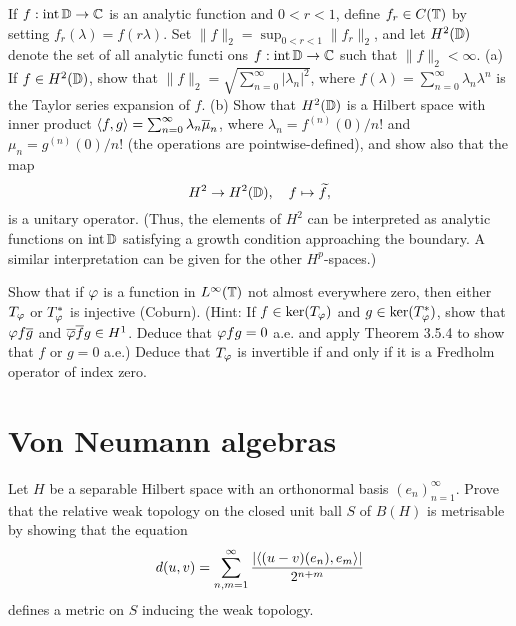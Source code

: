 \documentclass{../../small}
\begin{document}
\begin{prb}
If $f:\operatorname{int}\mathbb{D}\to\mathbb{C}$ is an analytic function and $0<r<1$, define $f_r\in C(\mathbb{T})$ by setting $f_r(\lambda)=f(r\lambda)$.
Set $\|f\|_2=\sup_{0<r<1}\|f_r\|_2$, and let $H^2(\mathbb{D})$ denote the set of all analytic functi ons $f:\operatorname{int}\mathbb{D}\to\mathbb{C}$ such that $\|f\|_2<\infty$.
(a) If $f\in H^2(\mathbb{D})$, show that $\|f\|_2=\sqrt{\sum_{n=0}^\infty|\lambda_n|^2}$, where $f(\lambda)=\sum_{n=0}^\infty\lambda_n\lambda^n$ is the Taylor series expansion of $f$.
(b) Show that $H^2(\mathbb{D})$ is a Hilbert space with inner product $\langle f,g\rangle=\sum_{n=0}^\infty\lambda_n\overline\mu_n$, where $\lambda_n=f^{(n)}(0)/n!$ and $\mu_n=g^{(n)}(0)/n!$ (the operations are pointwise-defined), and show also that the map 
\[H^2\to H^2(\mathbb{D}),\quad f\mapsto\widetilde f,\]
is a unitary operator.
(Thus, the elements of $H^2$ can be interpreted as analytic functions on $\operatorname{int}\mathbb{D}$ satisfying a growth condition approaching the boundary.
A similar interpretation can be given for the other $H^p$-spaces.)
\end{prb}
\begin{sol}
\end{sol}


\begin{prb}
Show that if $\varphi$ is a function in $L^\infty(\mathbb{T})$ not almost everywhere zero, then either $T_\varphi$ or $T_\varphi^*$ is injective (Coburn).
(Hint: If $f\in\ker(T_\varphi)$ and $g\in\ker(T_\varphi^*)$, show that $\varphi f\overline g$ and $\overline{\varphi}\overline fg\in H^1$.
Deduce that $\varphi fg=0$ a.e. and apply Theorem 3.5.4 to show that $f$ or $g=0$ a.e.)
Deduce that $T_\varphi$ is invertible if and only if it is a Fredholm operator of index zero.
\end{prb}
\begin{sol}
\end{sol}


\newpage
\section{Von Neumann algebras}

\begin{prb}
Let $H$ be a separable Hilbert space with an orthonormal basis $(e_n)_{n=1}^\infty$.
Prove that the relative weak topology on the closed unit ball $S$ of $B(H)$ is metrisable by showing that the equation
\[d(u,v)=\sum_{n,m=1}^\infty\frac{|\langle(u-v)(e_n), e_m\rangle|}{2^{n+m}}\]
defines a metric on $S$ inducing the weak topology.
\end{prb}
\begin{sol}
\end{sol}
\end{document}
